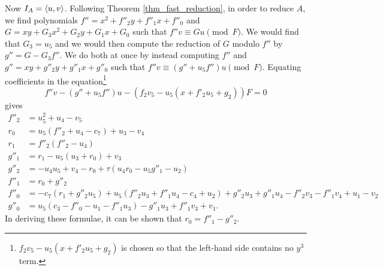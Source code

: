 Now $I_A = \left\langle u,v \right\rangle$.
Following Theorem \ref{thm_fast_reduction},
in order to reduce $A$, we find polynomials
$f'' = x^2 + f''_2y + f''_1x + f''_0$ and
$G = xy + G_3x^2 + G_2y + G_1x + G_0$ such that $f''v \equiv Gu \pmod F$.
We would find that $G_3 = u_5$ and we would then compute the reduction of $G$ modulo $f''$ by $g'' = G - G_3 f''$.
We do both at once by instead computing $f''$ and $g'' = xy + g''_2y + g''_1x + g''_0$
such that $f''v \equiv (g'' + u_5f'')u \pmod F$.
Equating coefficients in the equation\footnote{
$f_2v_5 - u_5(x + f'_2u_5 + g_2)$ is chosen so that the left-hand side contains no $y^3$ term.}
\[f''v - (g'' + u_5f'')u - (f_2v_5 - u_5(x + f'_2u_5 + g_2))F = 0 \]
gives
\begin{align*}
  f''_2 &= u_5^2 + u_4 - v_5 \\
  r_0   &= u_5(f''_2 + u_4 - c_7) + u_3 - v_4 \\
  r_1   &= f''_2(f''_2 - u_4) \\
  g''_1 &= r_1 - u_5(u_3 + r_0) + v_3 \\
  g''_2 &= -u_4u_5 + v_4 - r_0 + \tau(u_4r_0 - u_5g''_1 - u_2) \\
  f''_1 &= r_0 + g''_2 \\
  f''_0 &= -c_7(r_1 + g''_2u_5) + u_5(f''_2u_3 + f''_1u_4 - c_4 + u_2)
         + g''_2u_3 + g''_1u_4 - f''_2v_3 - f''_1v_4 + u_1 - v_2 \\
  g''_0 &= u_5(c_3 - f''_0 - u_1 - f''_1u_3) - g''_1u_3 + f''_1v_3 + v_1.
\end{align*}
In deriving these formulae, it can be shown that $r_0 = f''_1 - g''_2$.
\begin{comment}
\begin{align*}
  G_3 &= u_5 \\
  f''_2 &= u_5^2 + u_4 - v_5 \\
  G_2 &= v_4 + u_5v_5 + \tau(u_5(u_3u_5 + v_5(u_4 - c_7) - v_3) + v_5(u_3 - v_4) - u_2) \\
  e_3 &= f''_2v_5 - G_2u_5 \\
  f''_1 &= u_5(u_4 - c_7) + G_2 + u_3 - v_4 \\
  G_1 &= -u_3u_5 - e_3 + v_3 \\
  f''_0 &= c_7e_3 + u_5(u_2 - c_4) + G_2u_3 + G_1u_4 - f''_2v_3 - f''_1v_4 + u_1 - v_2 \\
  G_0 &= u_5(c_3 - u_1) - G_1u_3 + f''_1v_3 + v_1.
\end{align*}
\end{comment}
